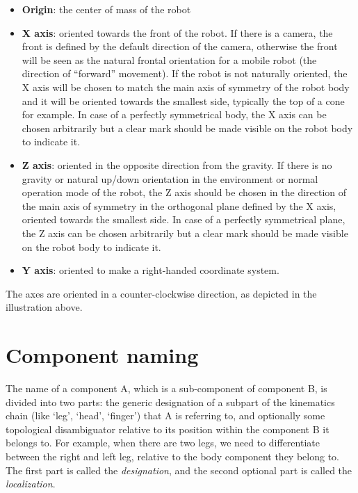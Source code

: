 \documentclass[a4paper]{article}
\begin{document}
\begin{figure}

\end{figure}

\begin{itemize}
\item {
\textsf{\textbf{Origin}}\textsf{: the center of mass of the robot}}
\end{itemize}
\begin{itemize}
\item {
\textsf{\textbf{X axis}}\textsf{: oriented towards the front of the
robot. If there is a camera, the front is defined by the default
direction of the camera, otherwise the front will be seen as the
natural frontal orientation for a mobile robot (the direction of
“forward” movement). If the robot is not naturally oriented, the X axis
will be chosen to match the main axis of symmetry of the robot body and
it will be oriented towards the smallest side, typically the top of a
cone for example. }\textsf{In case of a perfectly symmetrical body, the
X axis can be chosen arbitrarily but a clear mark should be made
visible on the robot body to indicate it.}}
\end{itemize}
\begin{itemize}
\item {
\textsf{\textbf{Z axis}}\textsf{: oriented in the opposite direction
from the gravity. If there is no gravity or natural up/down orientation
in the environment or normal operation mode of the robot, the Z axis
should be chosen in the direction of the main axis of symmetry in the
orthogonal plane defined by the X axis, oriented towards the smallest
side. In case of a perfectly symmetrical plane, the Z axis can be
chosen arbitrarily but a clear mark should be made visible on the robot
body to indicate it.}}
\end{itemize}
\begin{itemize}
\item {
\textsf{\textbf{Y axis}}\textsf{: oriented to make a right-handed
coordinate system. }}
\end{itemize}
{\sffamily
The axes are oriented in a counter-clockwise direction, as depicted in
the illustration above.}

\section[Component naming]{Component naming}
{
\textsf{The name of a component A, which is a sub-component of component
B, is divided into two parts: the generic designation of a subpart of
the kinematics chain (like ‘leg’, ‘head’, ‘finger’) that A is referring
to, and optionally some topological disambiguator relative to its
position within the component B it belongs to. For example, when there
are two legs, we need to differentiate between the right and left leg,
relative to the body component they belong to. The first part is called
the }\textsf{\textit{designation}}\textsf{, and the second optional
part is called the }\textsf{\textit{localization}}\textsf{.}}
\end{document}
